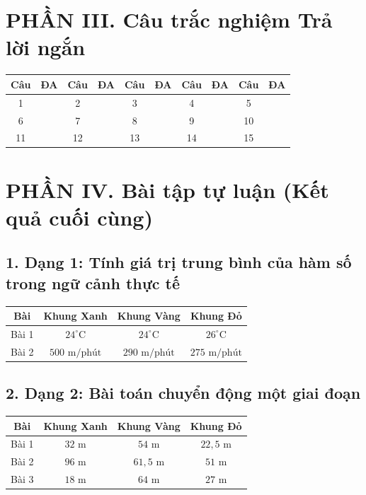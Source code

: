 \documentclass[12pt]{article}
\begin{document}
\vspace{0.5cm}

\section*{PHẦN III. Câu trắc nghiệm Trả lời ngắn}
\begin{center}
	\begin{tabular}{|c|c|c|c|c|c|c|c|c|c|}
		\hline
		\textbf{Câu} & \textbf{ĐA} & \textbf{Câu} & \textbf{ĐA} & \textbf{Câu} & \textbf{ĐA} & \textbf{Câu} & \textbf{ĐA} & \textbf{Câu} & \textbf{ĐA} \\
		\hline
		1 & & 2 & & 3 & & 4 & & 5 & \\
		\hline
		6 & & 7 & & 8 & & 9 & & 10 & \\
		\hline
		11 & & 12 & & 13 & & 14 & & 15 & \\
		\hline
	\end{tabular}
\end{center}

\vspace{0.5cm}

\section*{PHẦN IV. Bài tập tự luận (Kết quả cuối cùng)}

\subsection*{1. Dạng 1: Tính giá trị trung bình của hàm số trong ngữ cảnh thực tế}
\begin{center}
	\begin{tabular}{|c|c|c|c|}
		\hline
		\textbf{Bài} & \textbf{Khung Xanh} & \textbf{Khung Vàng} & \textbf{Khung Đỏ} \\
		\hline
		Bài 1 & $24^\circ\text{C}$ & $24^\circ\text{C}$ & $26^\circ\text{C}$ \\
		\hline
		Bài 2 & $500\text{ m/phút}$ & $290\text{ m/phút}$ & $275\text{ m/phút}$ \\
		\hline
	\end{tabular}
\end{center}

\subsection*{2. Dạng 2: Bài toán chuyển động một giai đoạn}
\begin{center}
	\begin{tabular}{|c|c|c|c|}
		\hline
		\textbf{Bài} & \textbf{Khung Xanh} & \textbf{Khung Vàng} & \textbf{Khung Đỏ} \\
		\hline
		Bài 1 & $32\text{ m}$ & $54\text{ m}$ & $22{,}5\text{ m}$ \\
		\hline
		Bài 2 & $96\text{ m}$ & $61{,}5\text{ m}$ & $51\text{ m}$ \\
		\hline
		Bài 3 & $18\text{ m}$ & $64\text{ m}$ & $27\text{ m}$ \\
		\hline
	\end{tabular}
\end{center}
\end{document}
